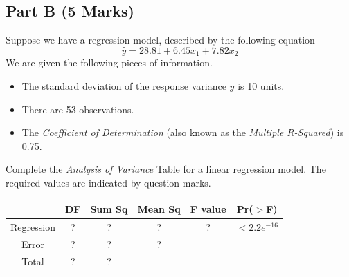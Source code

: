 \documentclass[a4paper,12pt]{article}
\begin{document}
\subsection*{Part B (5 Marks)}
Suppose we have a regression model, described by the following equation
\[ \hat{y} = 28.81 + 6.45x_1 + 7.82 x_2\]
We are given the following pieces of information.
\begin{itemize}
	\item The standard deviation of the response variance $y$ is 10 units.
	\item There are 53 observations.
	\item The \textit{Coefficient of Determination} (also known as the \textit{Multiple R-Squared}) is 0.75.
\end{itemize}
Complete the \textit{Analysis of Variance} Table for a linear regression model.
The required values are indicated by question marks.

\begin{center}
	\begin{tabular}{|c|c|c|c|c|c|} \hline
		\phantom{makespace}	& DF & 	Sum Sq &	Mean Sq &	F value &   	Pr($>$F)    \\ \hline
		Regression &  \phantom{make}?\phantom{make} &	? &	? &	 ? &	$< 2.2e^{-16}$ \\ \hline
		Error  & ? &	? &  	?   &            &       \\ \hline
		Total  & ?  &	? &  \phantom{makespace}	  &   \phantom{makespace}         &    \phantom{makespace}    \\ \hline
	\end{tabular} 
\end{center}

\bigskip
\end{document}
